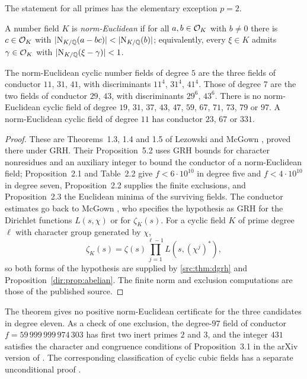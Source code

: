 The statement for all primes has the elementary exception $p=2$.

A number field $K$ is \emph{norm-Euclidean} if for all $a,b\in\mathcal{O}_K$ with $b\ne0$ there
is $c\in\mathcal{O}_K$ with $\lvert\operatorname{N}_{K/\mathbb{Q}}(a-bc)\rvert<\lvert\operatorname{N}_{K/\mathbb{Q}}(b)\rvert$; equivalently, every
$\xi\in K$ admits $\gamma\in\mathcal{O}_K$ with $\lvert\operatorname{N}_{K/\mathbb{Q}}(\xi-\gamma)\rvert<1$.

\begin{theorem}
\label{dir:thm:euclid}
The norm-Euclidean cyclic number fields of degree $5$ are the three fields of
conductor $11$, $31$, $41$, with discriminants $11^4$, $31^4$, $41^4$. Those of degree
$7$ are the two fields of conductor $29$, $43$, with discriminants $29^6$, $43^6$.
There is no norm-Euclidean cyclic field of degree
$19$, $31$, $37$, $43$, $47$, $59$, $67$, $71$, $73$, $79$ or $97$. A norm-Euclidean
cyclic field of degree $11$ has conductor $23$, $67$ or $331$.
\end{theorem}

\begin{proof}
These are Theorems~1.3, 1.4 and 1.5 of Lezowski and McGown
\cite{LezowskiMcGown2017Euclidean}, proved there under GRH. Their Proposition~5.2 uses
GRH bounds for character nonresidues and an auxiliary integer to bound the conductor of
a norm-Euclidean field; Proposition~2.1 and Table~2.2 give $f<6\cdot10^{10}$ in degree
five and $f<4\cdot10^{10}$ in degree seven, Proposition~2.2 supplies the finite
exclusions, and Proposition~2.3 the Euclidean minima of the surviving fields. The
conductor estimates go back to McGown \cite{McGown2012Norm}, who specifies the
hypothesis as GRH for the Dirichlet functions $L(s,\chi)$ or for $\zeta_K(s)$. For a
cyclic field $K$ of prime degree $\ell$ with character group generated by $\chi$,
\[
 \zeta_K(s)=\zeta(s)\prod_{j=1}^{\ell-1}L(s,(\chi^j)^*),
\]
so both forms of the hypothesis are supplied by \cref{src:thm:dgrh} and
Proposition~\ref{dir:prop:abelian}. The finite norm and exclusion computations are those of the
published source.
\end{proof}

The theorem gives no positive norm-Euclidean certificate for the three candidates in
degree eleven. As a check of one exclusion, the degree-$97$ field of conductor
$f=59\,999\,999\,974\,303$ has first two inert primes $2$ and $3$, and the integer
$431$ satisfies the character and congruence conditions of Proposition~3.1 in the arXiv
version of \cite{LezowskiMcGown2017Euclidean}. The corresponding classification of
cyclic cubic fields has a separate unconditional proof
\cite{BaggerEtAl2025Determination}.

